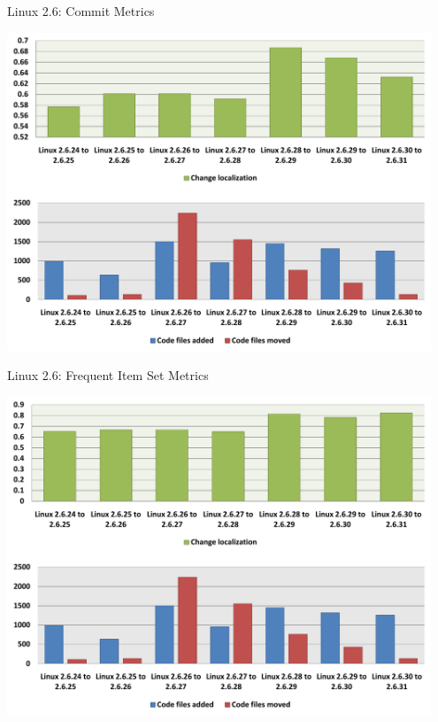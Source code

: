 
\begin{frame}{Linux 2.6: Commit Metrics}

  \begin{center}
    \includegraphics[width=0.95\textwidth]{minings/linux-2-6-commit-metrics}
  \end{center}

\end{frame}


\begin{frame}{Linux 2.6: Frequent Item Set Metrics}

  \begin{center}
    \includegraphics[width=0.95\textwidth]{minings/linux-2-6-fis-metrics}
  \end{center}

\end{frame}

